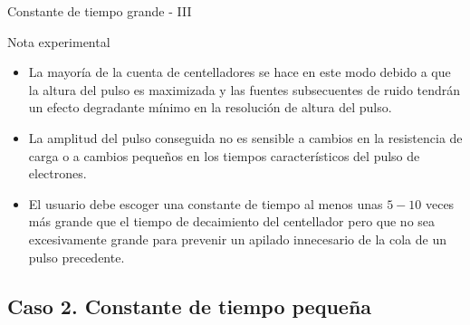 \documentclass[a4paper,10pt]{beamer}
\begin{document}
\begin{frame}{Constante de tiempo grande - III}
 
 \begin{exampleblock}{Nota experimental}
  \begin{itemize}[<+->]
   \item \begin{justify}
          La mayoría de la cuenta de centelladores se hace en este modo debido a 
          que la altura del pulso es maximizada y las fuentes subsecuentes de ruido 
          tendrán un efecto degradante mínimo en la resolución de altura del pulso.
          \end{justify}
   \item \begin{justify}
	  La amplitud del pulso conseguida no es sensible a cambios en la resistencia 
	  de carga o a cambios pequeños en los tiempos característicos del pulso 
	  de electrones.
         \end{justify}
   \item \begin{justify}
          El usuario debe escoger una constante de tiempo al menos unas $5-10$ veces 
          más grande que el tiempo de decaimiento del centellador pero que no sea
          excesivamente grande para prevenir un apilado innecesario de la cola de 
          un pulso precedente. 
         \end{justify}      
  \end{itemize}
 \end{exampleblock}
\end{frame}

\subsection{Caso 2. Constante de tiempo pequeña}
\end{document}
